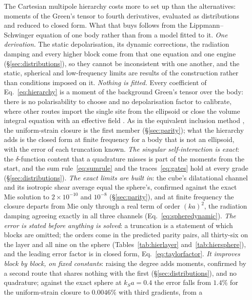 \documentclass[preprint,review,12pt]{elsarticle}
\begin{document}
The Cartesian multipole hierarchy costs more to set up than the alternatives: moments of the Green's
tensor to fourth derivatives, evaluated as distributions and reduced to closed form. What that buys
follows from the Lippmann--Schwinger equation of one body rather than from a model fitted to it.
\emph{One derivation.} The static depolarisation, its dynamic corrections, the radiation damping and
every higher block come from that one equation and one engine (\S\ref{sec:distributions}), so they
cannot be inconsistent with one another, and the static, spherical and low-frequency limits are results
of the construction rather than conditions imposed on it. \emph{Nothing is fitted.} Every coefficient of
Eq.~\eqref{eq:hierarchy} is a moment of the background Green's tensor over the body: there is no
polarisability to choose and no depolarisation factor to calibrate, where other routes import the single
site from the ellipsoid \citep{Eshelby1957,Mura1987} or close the volume integral equation with an
effective field \citep{MalKnopoff1967,Kanaun2008}. As in the equivalent inclusion method
\citep{Moschovidis1975,FuMura1983}, the uniform-strain closure is the first member (\S\ref{sec:parity});
what the hierarchy adds is the closed form at finite frequency for a body that is not an ellipsoid, with
the error of each truncation known. \emph{The singular self-interaction is exact}: the $\delta$-function
content that a quadrature misses is part of the moments from the start, and the sum
rule~\eqref{eq:sumrule} and the traces~\eqref{eq:gates} hold at every grade (\S\ref{sec:distributions}).
\emph{The exact limits are built in}: the cube's dilatational channel and its isotropic shear average
equal the sphere's, confirmed against the exact Mie solution to $2\times10^{-10}$ and $10^{-8}$
(\S\ref{sec:parity}), and at finite frequency the closure departs from Mie only through a real term of
order $(ka)^2$, the radiation damping agreeing exactly in all three channels
(Eq.~\eqref{eq:spheredynamic}). \emph{The error is stated before anything is solved}: a truncation is a
statement of which blocks are omitted; the orders come in the predicted parity pairs, all thirty-six on
the layer and all nine on the sphere (Tables~\ref{tab:hierlayer} and~\ref{tab:hiersphere}), and the
leading error factor is in closed form, Eq.~\eqref{eq:taylorfactor}. \emph{It improves block by block,
on fixed constants}: raising the degree adds moments, confirmed by a second route that shares nothing
with the first (\S\ref{sec:distributions}), and no quadrature; against the exact sphere at $k_Sa=0.4$
the error falls from $1.4\%$ for the uniform-strain closure to $0.0046\%$ with third gradients, from a
\end{document}
